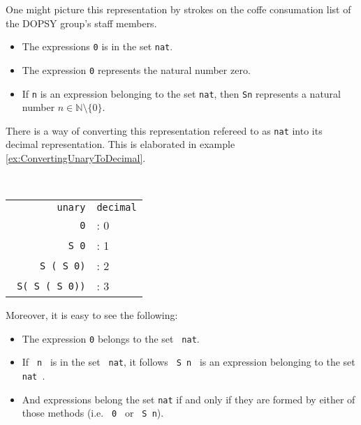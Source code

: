 	 One might picture this representation by strokes on the coffe consumation list of the DOPSY group's staff members.  
	  \begin{itemize}
	  \item The expressions \lstinline!0! is in the set \lstinline!nat!.
	  \item The expression \lstinline!0! represents the natural number zero. 
	  \item If \lstinline!n! is an expression belonging to the set \lstinline!nat!, then \lstinline!Sn! represents a natural number $n\in\mathbb{N}\setminus\{ 0\}$.  
	  \end{itemize}
	  There is a way of converting this representation refereed to as \lstinline!nat! into its decimal representation. 
	  This is elaborated in example \ref{ex:ConvertingUnaryToDecimal}.
	  \begin{example} \label{ex:ConvertingUnaryToDecimal} ~\\%
	  \begin{center}  
		  \begin{tabular} {r l}
		  
			  \texttt{unary}				& \texttt{decimal}	\\
			  \texttt{\lstinline!0!} 		&: 0 				\\
			  \texttt{\lstinline! S 0!}  	&: 1				\\
			  \texttt{\lstinline! S ( S 0)!}	&: 2			\\
			  \texttt{\lstinline! S( S ( S 0))!}	&: 3		\\
			    
		  \end{tabular}
		  \end{center}
	  \end{example}
	  Moreover, it is easy to see the following: 
	  \begin{itemize}
	  \item The expression \lstinline!0! belongs to the set \lstinline! nat!.
	  \item If \lstinline! n ! is in the set \lstinline! nat!, it follows \lstinline! S n ! is an expression belonging to the set \lstinline! nat !.
	  \item And expressions belong the set \lstinline!nat! if and only if they are  formed by either of those methods (i.e. \lstinline! 0 ! or  \lstinline! S n!). 
	  \end{itemize}  
